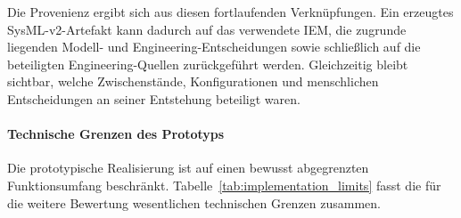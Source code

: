 Die Provenienz ergibt sich aus diesen fortlaufenden Verknüpfungen. Ein
erzeugtes SysML-v2-Artefakt kann dadurch auf das verwendete IEM, die
zugrunde liegenden Modell- und Engineering-Entscheidungen sowie schließlich
auf die beteiligten Engineering-Quellen zurückgeführt werden. Gleichzeitig
bleibt sichtbar, welche Zwischenstände, Konfigurationen und menschlichen
Entscheidungen an seiner Entstehung beteiligt waren.

\FloatBarrier

\paragraph{Technische Grenzen des Prototyps}

Die prototypische Realisierung ist auf einen bewusst abgegrenzten
Funktionsumfang beschränkt. Tabelle~\ref{tab:implementation_limits} fasst
die für die weitere Bewertung wesentlichen technischen Grenzen zusammen.

